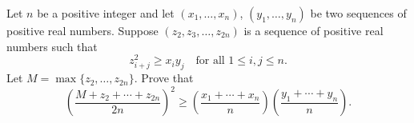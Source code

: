 Let $n$ be a positive integer and let $(x_1, \ldots, x_n)$, $(y_1, \ldots, y_n)$ be two sequences of positive real numbers. Suppose $(z_2, z_3, \ldots, z_{2n})$ is a sequence of positive real numbers such that
\[ z_{i+j}^2 \geq x_i y_j \quad \text{for all } 1 \leq i, j \leq n. \]
Let $M = \max\{z_2, \ldots, z_{2n}\}$. Prove that
\[ \left( \frac{M + z_2 + \cdots + z_{2n}}{2n} \right)^2 \geq \left( \frac{x_1 + \cdots + x_n}{n} \right) \left( \frac{y_1 + \cdots + y_n}{n} \right). \]
